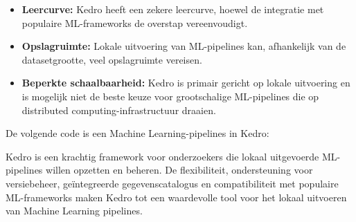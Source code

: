 \begin{itemize}
    \item \textbf{Leercurve:} Kedro heeft een zekere leercurve, hoewel de integratie met populaire ML-frameworks de overstap vereenvoudigt.
    \item \textbf{Opslagruimte:} Lokale uitvoering van ML-pipelines kan, afhankelijk van de datasetgrootte, veel opslagruimte vereisen.
    \item \textbf{Beperkte schaalbaarheid:} Kedro is primair gericht op lokale uitvoering en is mogelijk niet de beste keuze voor grootschalige ML-pipelines die op distributed computing-infrastructuur draaien.
\end{itemize}

De volgende code is een Machine Learning-pipelines in Kedro: 
    
Kedro is een krachtig framework voor onderzoekers die lokaal uitgevoerde ML-pipelines willen opzetten en beheren. De flexibiliteit, ondersteuning voor versiebeheer, geïntegreerde gegevenscatalogus en compatibiliteit met populaire ML-frameworks maken Kedro tot een waardevolle tool voor het lokaal uitvoeren van Machine Learning pipelines.

